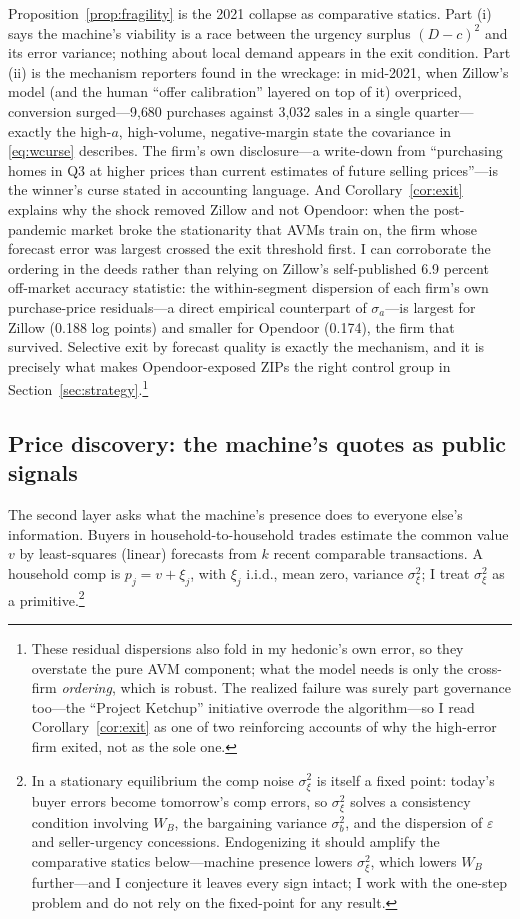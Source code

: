 \documentclass[12pt, letterpaper]{article}
\theoremstyle{remark}
\begin{document}
Proposition~\ref{prop:fragility} is the 2021 collapse as comparative statics. Part (i) says the machine's viability is a race between the urgency surplus $(D-c)^2$ and its error variance; nothing about local demand appears in the exit condition. Part (ii) is the mechanism reporters found in the wreckage: in mid-2021, when Zillow's model (and the human ``offer calibration'' layered on top of it) overpriced, conversion surged---9{,}680 purchases against 3{,}032 sales in a single quarter---exactly the high-$a$, high-volume, negative-margin state the covariance in \eqref{eq:wcurse} describes. The firm's own disclosure---a write-down from ``purchasing homes in Q3 at higher prices than current estimates of future selling prices''---is the winner's curse stated in accounting language. And Corollary~\ref{cor:exit} explains why the shock removed Zillow and not Opendoor: when the post-pandemic market broke the stationarity that AVMs train on, the firm whose forecast error was largest crossed the exit threshold first. I can corroborate the ordering in the deeds rather than relying on Zillow's self-published 6.9 percent off-market accuracy statistic: the within-segment dispersion of each firm's own purchase-price residuals---a direct empirical counterpart of $\sigma_a$---is largest for Zillow (0.188 log points) and smaller for Opendoor (0.174), the firm that survived. Selective exit by forecast quality is exactly the mechanism, and it is precisely what makes Opendoor-exposed ZIPs the right control group in Section~\ref{sec:strategy}.\footnote{These residual dispersions also fold in my hedonic's own error, so they overstate the pure AVM component; what the model needs is only the cross-firm \emph{ordering}, which is robust. The realized failure was surely part governance too---the ``Project Ketchup'' initiative overrode the algorithm---so I read Corollary~\ref{cor:exit} as one of two reinforcing accounts of why the high-error firm exited, not as the sole one.}

\subsection{Price discovery: the machine's quotes as public signals}\label{sec:model-discovery}

The second layer asks what the machine's presence does to everyone else's information. Buyers in household-to-household trades estimate the common value $v$ by least-squares (linear) forecasts from $k$ recent comparable transactions. A household comp is $p_j = v + \xi_j$, with $\xi_j$ i.i.d., mean zero, variance $\sigma_\xi^2$; I treat $\sigma_\xi^2$ as a primitive.\footnote{In a stationary equilibrium the comp noise $\sigma_\xi^2$ is itself a fixed point: today's buyer errors become tomorrow's comp errors, so $\sigma_\xi^2$ solves a consistency condition involving $W_B$, the bargaining variance $\sigma_b^2$, and the dispersion of $\varepsilon$ and seller-urgency concessions. Endogenizing it should amplify the comparative statics below---machine presence lowers $\sigma_\xi^2$, which lowers $W_B$ further---and I conjecture it leaves every sign intact; I work with the one-step problem and do not rely on the fixed-point for any result.}
\end{document}
